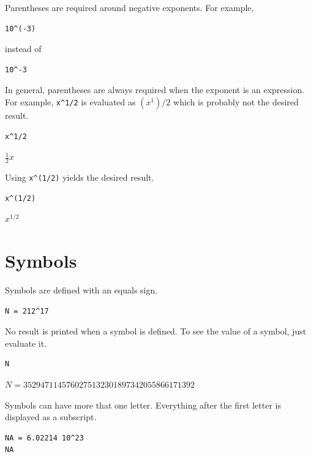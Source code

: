 \documentclass[12pt]{article}
\begin{document}
\newpage

Parentheses are required around negative exponents.
For example,

{\color{blue}
\begin{verbatim}
10^(-3)
\end{verbatim}
}

instead of

{\color{blue}
\begin{verbatim}
10^-3
\end{verbatim}
}

In general, parentheses are always required when the exponent
is an expression.
For example, \verb$x^1/2$ is evaluated as $(x^1)/2$ which
is probably not the desired result.

{\color{blue}
\begin{verbatim}
x^1/2
\end{verbatim}
}

$\displaystyle \tfrac{1}{2}x$

\bigskip

Using \verb$x^(1/2)$ yields the desired result.

{\color{blue}
\begin{verbatim}
x^(1/2)
\end{verbatim}
}

$\displaystyle x^{1/2}$

\newpage

\section{Symbols}

Symbols are defined with an equals sign.

{\color{blue}
\begin{verbatim}
N = 212^17
\end{verbatim}
}

No result is printed when a symbol is defined.
To see the value of a symbol, just evaluate it.

{\color{blue}
\begin{verbatim}
N
\end{verbatim}
}

$\displaystyle N=3529471145760275132301897342055866171392$

\bigskip

Symbols can have more that one letter.
Everything after the first letter is displayed as a subscript.

{\color{blue}
\begin{verbatim}
NA = 6.02214 10^23
NA
\end{verbatim}
}
\end{document}
